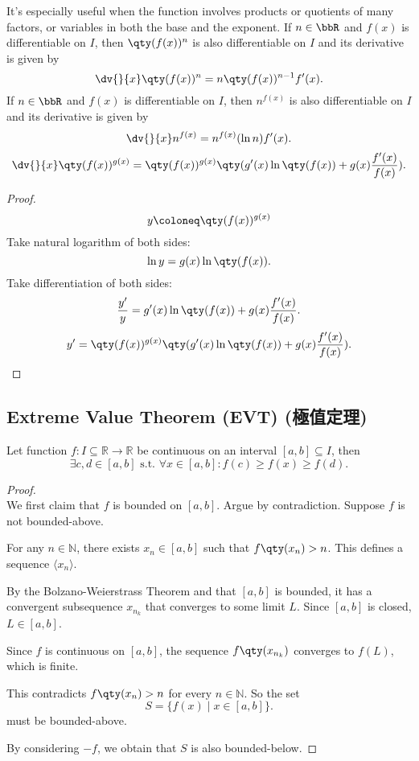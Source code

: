 \documentclass[a4paper,12pt]{report}
\begin{document}
\begin{itemize}
\begin{itemize}
It’s especially useful when the function involves products or quotients of many factors, or variables in both the base and the exponent.
If $n\in\bbR$ and $f(x)$ is differentiable on $I$, then $\qty(f(x))^n$ is also differentiable on $I$ and its derivative is given by
\[\dv{}{x}\qty(f(x))^n=n\qty(f(x))^{n-1}f'(x).\]
If $n\in\bbR$ and $f(x)$ is differentiable on $I$, then $n^{f(x)}$ is also differentiable on $I$ and its derivative is given by
\[\dv{}{x}n^{f(x)}=n^{f(x)}(\ln n)f'(x).\]
\[\dv{}{x}\qty(f(x))^{g(x)}=\qty(f(x))^{g(x)}\qty(g'(x)\ln\qty(f(x))+g(x)\frac{f'(x)}{f(x)}).\]
\begin{proof}
\[y\coloneq\qty(f(x))^{g(x)}\]
Take natural logarithm of both sides:
\[\ln y=g(x)\ln\qty(f(x)).\]
Take differentiation of both sides:
\[\frac{y'}{y}=g'(x)\ln\qty(f(x))+g(x)\frac{f'(x)}{f(x)}.\]
\[y'=\qty(f(x))^{g(x)}\qty(g'(x)\ln\qty(f(x))+g(x)\frac{f'(x)}{f(x)}).\]
\end{proof}
\subsection{Extreme Value Theorem (EVT) (極值定理)}
Let function $f\colon I\subseteq\mathbb{R}\to\mathbb{R}$ be continuous on an interval $[a,b]\subseteq I$, then
\[\exists c,d \in [a, b] \text{\ s.t.\ }\forall x \in [a, b]\colon f(c)\geq f(x)\geq f(d).\]
\begin{proof}\mbox{}\\
We first claim that $f$ is bounded on $[a,b]$. Argue by contradiction. Suppose $f$ is not bounded-above.

For any $n\in\mathbb{N}$, there exists $x_n\in [a,b]$ such that $f\qty(x_n)>n$. This defines a sequence $\langle x_n\rangle$.

By the Bolzano-Weierstrass Theorem and that $[a,b]$ is bounded, it has a convergent subsequence $x_{n_k}$ that converges to some limit $L$. Since $[a,b]$ is closed, $L\in [a,b]$.

Since $f$ is continuous on $[a,b]$, the sequence $f\qty(x_{n_k})$ converges to $f(L)$, which is finite.

This contradicts $f\qty(x_n)>n$ for every $n\in\mathbb{N}$. So the set
\[S=\{f(x)\mid x\in [a,b]\}.\]
must be bounded-above.

By considering $-f$, we obtain that $S$ is also bounded-below.


\end{proof}
\end{itemize}
\end{itemize}
\end{document}
